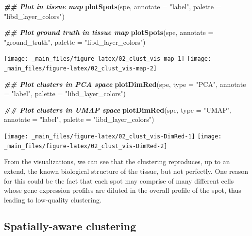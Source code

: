 \documentclass[
]{book}
\newenvironment{Shaded}{\begin{snugshade}}{\end{snugshade}}
\newcommand{\AttributeTok}[1]{\textcolor[rgb]{0.13,0.29,0.53}{#1}}
\newcommand{\DocumentationTok}[1]{\textcolor[rgb]{0.56,0.35,0.01}{\textbf{\textit{#1}}}}
\newcommand{\FunctionTok}[1]{\textcolor[rgb]{0.13,0.29,0.53}{\textbf{#1}}}
\newcommand{\NormalTok}[1]{#1}
\newcommand{\StringTok}[1]{\textcolor[rgb]{0.31,0.60,0.02}{#1}}
\begin{document}
\begin{Shaded}
\begin{Highlighting}[]
\DocumentationTok{\#\# Plot in tissue map}
\FunctionTok{plotSpots}\NormalTok{(spe, }\AttributeTok{annotate =} \StringTok{"label"}\NormalTok{, }
          \AttributeTok{palette =} \StringTok{"libd\_layer\_colors"}\NormalTok{)}

\DocumentationTok{\#\# Plot ground truth in tissue map}
\FunctionTok{plotSpots}\NormalTok{(spe, }\AttributeTok{annotate =} \StringTok{"ground\_truth"}\NormalTok{, }
          \AttributeTok{palette =} \StringTok{"libd\_layer\_colors"}\NormalTok{)}
\end{Highlighting}
\end{Shaded}

\texttt{[image: \_main\_files/figure-latex/02\_clust\_vis-map-1]} \texttt{[image: \_main\_files/figure-latex/02\_clust\_vis-map-2]}

\begin{Shaded}
\begin{Highlighting}[]
\DocumentationTok{\#\# Plot clusters in PCA space}
\FunctionTok{plotDimRed}\NormalTok{(spe, }\AttributeTok{type =} \StringTok{"PCA"}\NormalTok{, }
           \AttributeTok{annotate =} \StringTok{"label"}\NormalTok{, }\AttributeTok{palette =} \StringTok{"libd\_layer\_colors"}\NormalTok{)}

\DocumentationTok{\#\# Plot clusters in UMAP space}
\FunctionTok{plotDimRed}\NormalTok{(spe, }\AttributeTok{type =} \StringTok{"UMAP"}\NormalTok{, }
           \AttributeTok{annotate =} \StringTok{"label"}\NormalTok{, }\AttributeTok{palette =} \StringTok{"libd\_layer\_colors"}\NormalTok{)}
\end{Highlighting}
\end{Shaded}

\texttt{[image: \_main\_files/figure-latex/02\_clust\_vis-DimRed-1]} \texttt{[image: \_main\_files/figure-latex/02\_clust\_vis-DimRed-2]}

From the visualizations, we can see that the clustering reproduces, up to an extend, the known biological structure of the tissue, but not perfectly. One reason for this could be the fact that each spot may comprise of many different cells whose gene expression profiles are diluted in the overall profile of the spot, thus leading to low-quality clustering.

\hypertarget{spatially-aware-clustering}{%
\subsection{Spatially-aware clustering}\label{spatially-aware-clustering}}
\end{document}
